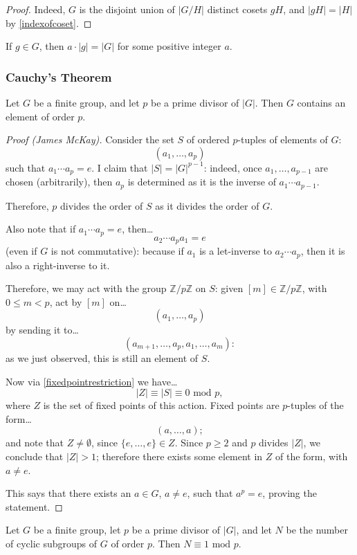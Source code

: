 \begin{proof}
Indeed, $G$ is the disjoint union of $|G/H|$ distinct cosets $gH$, and $|gH| = |H|$ by \ref{indexofcoset}.
\end{proof}

\begin{corollary}
\label{elementorderdividesgrouporder}
If $g \in G$, then $a \cdot |g| = |G|$ for some positive integer $a$.
\end{corollary}

\subsubsection{Cauchy's Theorem}

\begin{theorem}
\label{cauchysthm}
Let $G$ be a finite group, and let $p$ be a prime divisor of $|G|$. Then $G$ contains an element of order $p$.
\end{theorem}

\begin{proof}[Proof (James McKay)]
Consider the set $S$ of ordered $p$-tuples of elements of $G$:
$$(a_1, \dots, a_p)$$
such that $a_1\cdots a_p = e$. I claim that $|S| = |G|^{p-1}$: indeed, once $a_1, \dots, a_{p-1}$ are chosen (arbitrarily), then
$a_p$ is determined as it is the inverse of $a_1 \cdots a_{p-1}.$

Therefore, $p$ divides the order of $S$ as it divides the order of $G$.

Also note that if $a_1\cdots a_p = e$, then\dots
$$a_2\cdots a_pa_1 = e$$
(even if $G$ is not commutative): because if $a_1$ is a let-inverse to $a_2\cdots a_p$, then it is also a right-inverse to it.

Therefore, we may act with the group $\mathbb{Z} / p \mathbb{Z}$ on $S$: given $[m] \in \mathbb{Z} / p \mathbb{Z}$, with
$0 \leq m < p$, act by $[m]$ on\dots
$$(a_1,\dots,a_p)$$
by sending it to\dots
$$(a_{m+1}, \dots, a_p, a_1, \dots, a_m):$$
as we just observed, this is still an element of $S$.

Now via \ref{fixedpointrestriction} we have\dots
$$|Z| \equiv |S| \equiv 0 \textrm{ mod } p,$$
where $Z$ is the set of fixed points of this action. Fixed points are $p$-tuples of the form\dots
$$(a, \dots, a);$$
and note that $Z \neq \emptyset$, since $\{ e, \dots, e\} \in Z$. Since $p \geq 2$ and $p$ divides $|Z|$, we conclude that $|Z| > 1$;
therefore there exists some element in $Z$ of the form, with $a \neq e$.

This says that there exists an $a \in G$, $a \neq e$, such that $a^p = e$, proving the statement.
\end{proof}

\begin{corollary}
Let $G$ be a finite group, let $p$ be a prime divisor of $|G|$, and let $N$ be the number of cyclic subgroups of $G$ of order $p$. Then $N \equiv 1 \textrm{ mod } p$.
\end{corollary}